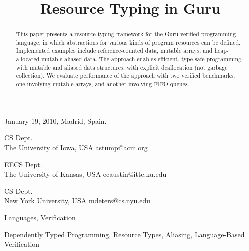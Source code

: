 \documentclass[9pt,natbib]{sigplanconf}
\begin{document}
 {January 19, 2010, Madrid, Spain.}
\copyrightdata{\ } 

\titlebanner{\ }        %
\preprintfooter{\ }   %



\title{Resource Typing in Guru}

{CS Dept.\\ The University of Iowa, USA}
{astump@acm.org}

{EECS Dept.\\ The University of Kansas, USA}
{ecaustin@ittc.ku.edu}

{CS Dept.\\ New York University, USA}
{mdeters@cs.nyu.edu}

\maketitle


\begin{abstract}
This paper presents a resource typing framework for the Guru
verified-programming language, in which abstractions for various kinds
of program resources can be defined.  Implemented examples include
reference-counted data, mutable arrays, and heap-allocated mutable
aliased data.  The approach enables efficient, type-safe programming
with mutable and aliased data structures, with explicit deallocation
(not garbage collection).  We evaluate performance of the approach
with two verified benchmarks, one involving mutable arrays, and
another involving FIFO queues.
\end{abstract}


\terms
Languages, Verification

\keywords
Dependently Typed Programming, Resource Types, Aliasing, Language-Based Verification
\end{document}
